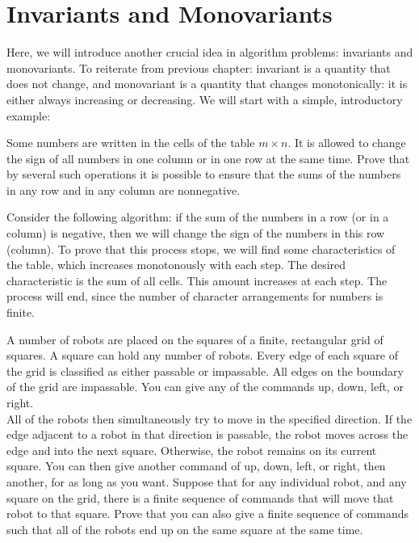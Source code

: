 \section{Invariants and Monovariants}

Here, we will introduce another crucial idea in algorithm problems: invariants and monovariants. To reiterate from previous chapter: invariant is a quantity that does not change, and monovariant is a quantity that changes monotonically: it is either always increasing or decreasing. We will start with a simple, introductory example: 

\begin{example}
    Some numbers are written in the cells of the table $m \times n$. It is allowed to change the sign of all numbers in one column or in one row at the same time. Prove that by several such operations it is possible to ensure that the sums of the numbers in any row and in any column are nonnegative.
\end{example}

\sol Consider the following algorithm: if the sum of the numbers in a row (or in a column) is negative, then we will change the sign of the numbers in this row (column). To prove that this process stops, we will find some characteristics of the table, which increases monotonously with each step. The desired characteristic is the sum of all cells. This amount increases at each step. The process will end, since the number of character arrangements for numbers is finite.

\begin{example}[Canada 2014]
    A number of robots are placed on the squares of a finite, rectangular grid of squares. A square can hold any number of robots. Every edge of each square of the grid is classified as either passable or impassable. All edges on the boundary of the grid are impassable. You can give any of the commands up, down, left, or right.\\
    All of the robots then simultaneously try to move in the specified direction. If the edge adjacent to a robot in that direction is passable, the robot moves across the edge and into the next square. Otherwise, the robot remains on its current square. You can then give another command of up, down, left, or right, then another, for as long as you want. Suppose that for any individual robot, and any square on the grid, there is a finite sequence of commands that will move that robot to that square. Prove that you can also give a finite sequence of commands such that all of the robots end up on the same square at the same time.
\end{example}

